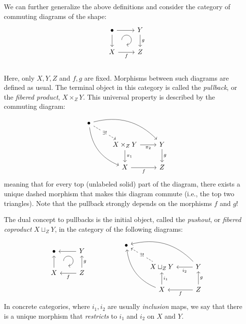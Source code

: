 %
\begin{defn}[Pullback]\label{pullbacks}
    We can further generalize the above definitions and consider the
    category of commuting diagrams of the shape: \[\begin{tikzcd}[every matrix/.append style={name=m},   
    execute at end picture={\draw [<-] ([xshift=-7mm,yshift=1mm]m-2-2.north) arc[start angle=-90,delta angle=270,radius=0.25cm];}]
    \bullet \arrow[r]\arrow[d]& Y\arrow[d,"g"] \\
    X\arrow[r,swap,"f"]& Z\\
    \end{tikzcd}\]
    Here, only $X,Y,Z$ and $f,g$ are fixed. Morphisms between such diagrams
    are defined as usual. The terminal object in this category is called
    the \emph{pullback}, or the \emph{fibered product}, $X\times_{Z}Y$.
    This universal property is described by the commuting diagram:\[\begin{tikzcd}
    \bullet   \arrow[drr, bend left]   \arrow[ddr, bend right]   \arrow[dr, dashed,"\exists!" description] & & \\
        & X \times_Z Y \arrow[r,swap, "\pi_2"] \arrow[d, "\pi_1"]       & Y \arrow[d, "g"] \\ & X \arrow[r,swap, "f"] &Z 
    \end{tikzcd}\]meaning that for every top (unlabeled solid) part of the diagram,
    there exists a unique dashed morphism that makes this diagram commute
    (i.e., the top two triangles). Note that the pullback strongly depends
    on the morphisms $f$ and $g$!
\end{defn}
%
\begin{defn}[Pushouts]\label{pushouts}
    The dual concept to pullbacks is the initial object, called the \emph{pushout}, or \emph{fibered coproduct} $X\sqcup_{Z}Y$, in the category of the following diagrams:
    \[\begin{tikzcd}[every matrix/.append style={name=m},   
    execute at end picture={\draw [<-] ([xshift=-7mm,yshift=1mm]m-2-2.north) arc[start angle=-90,delta angle=270,radius=0.25cm];}]
    \bullet \arrow[r,leftarrow]\arrow[d,leftarrow]& Y\arrow[d,leftarrow,"g"] \\
    X\arrow[r,,leftarrow,swap,"f"]& Z\\
    \end{tikzcd}\quad\quad\quad\quad\quad
    \begin{tikzcd}
    \bullet   \arrow[drr,leftarrow, bend left]   \arrow[ddr,leftarrow, bend right]   \arrow[dr,leftarrow, dashed,"\exists!" description] & & \\
        & X \sqcup_Z Y \arrow[r,leftarrow,swap, "i_2"] \arrow[d,leftarrow, "i_1"]       & Y \arrow[d,leftarrow, "g"] \\ & X \arrow[r,leftarrow,swap, "f"] &Z 
    \end{tikzcd}
    \]
    In concrete categories, where $i_1,i_2$ are usually \emph{inclusion} maps, we say that there is a unique morphism that \emph{restricts} to $i_1$ and $i_2$ on $X$ and $Y$.
\end{defn}
